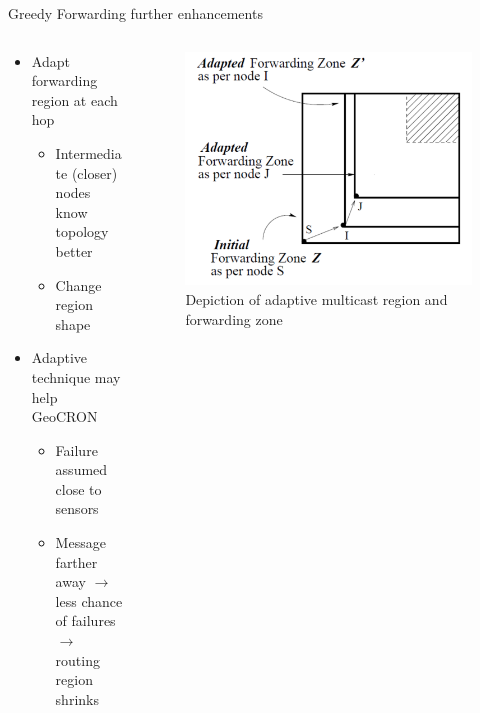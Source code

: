 \documentclass[pdftex]{beamer}
\begin{document}
\begin{frame}{Greedy Forwarding further enhancements}
\begin{columns}
\begin{column}{.5\textwidth}
\begin{itemize}
	\item Adapt forwarding region at each hop \cite{749282}
		\begin{itemize}
			\item Intermediate (closer) nodes know topology better
			\item Change region shape
		\end{itemize}
	\item Adaptive technique may help GeoCRON
		\begin{itemize}
			\item Failure assumed close to sensors
			\item Message farther away $\rightarrow$\\ less chance of failures $\rightarrow$\\ routing region shrinks
		\end{itemize}
\end{itemize}
\end{column}

\begin{column}{.5\textwidth}
\begin{figure}
\includegraphics[width=\textwidth]{adaptive_geocast_region}
\caption{Depiction of adaptive multicast region and forwarding zone}
\end{figure}
\end{column}
\end{columns}
\end{frame}
\end{document}
